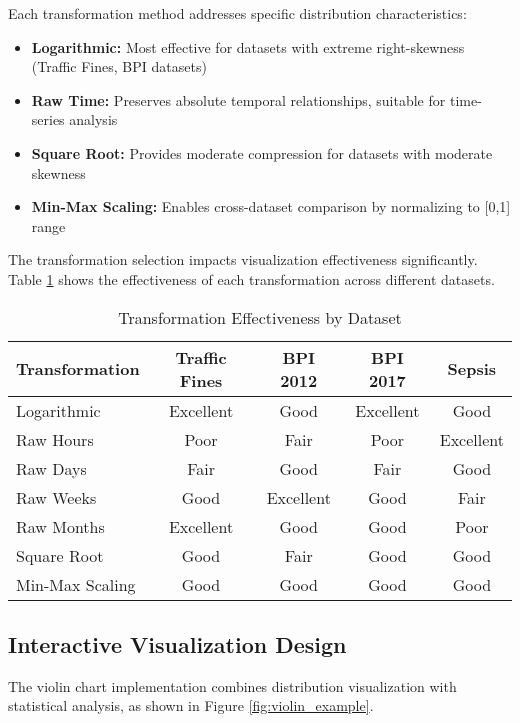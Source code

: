 \documentclass[11pt,a4paper]{article}
\begin{document}
Each transformation method addresses specific distribution characteristics:

\begin{itemize}
    \item \textbf{Logarithmic:} Most effective for datasets with extreme right-skewness (Traffic Fines, BPI datasets)
    \item \textbf{Raw Time:} Preserves absolute temporal relationships, suitable for time-series analysis
    \item \textbf{Square Root:} Provides moderate compression for datasets with moderate skewness
    \item \textbf{Min-Max Scaling:} Enables cross-dataset comparison by normalizing to [0,1] range
\end{itemize}

The transformation selection impacts visualization effectiveness significantly. Table \ref{tab:transformation_effectiveness} shows the effectiveness of each transformation across different datasets.

\begin{table}[H]
\centering
\caption{Transformation Effectiveness by Dataset}
\label{tab:transformation_effectiveness}
\begin{tabular}{@{}lcccc@{}}
\toprule
\textbf{Transformation} & \textbf{Traffic Fines} & \textbf{BPI 2012} & \textbf{BPI 2017} & \textbf{Sepsis} \\
\midrule
Logarithmic & Excellent & Good & Excellent & Good \\
Raw Hours & Poor & Fair & Poor & Excellent \\
Raw Days & Fair & Good & Fair & Good \\
Raw Weeks & Good & Excellent & Good & Fair \\
Raw Months & Excellent & Good & Good & Poor \\
Square Root & Good & Fair & Good & Good \\
Min-Max Scaling & Good & Good & Good & Good \\
\bottomrule
\end{tabular}
\end{table}

\subsection{Interactive Visualization Design}

The violin chart implementation combines distribution visualization with statistical analysis, as shown in Figure \ref{fig:violin_example}.
\end{document}
